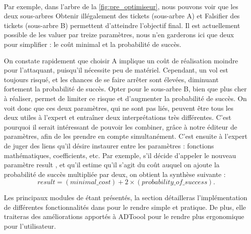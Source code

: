 			\paragraph{}
			Par exemple, dans l'arbre de la {} \ref{fig:pre_optimiseur}, nous pouvons voir que les deux sous-arbres \og Obtenir illégalement des tickets \fg{} (sous-arbre A) et \og Falsifier des tickets \fg{} (sous-arbre B) permettent d'atteindre l'objectif final. Il est actuellement possible de les valuer par treize paramètres, nous n'en garderons ici que deux pour simplifier : le coût minimal et la probabilité de succès.

			On constate rapidement que choisir A implique un coût de réalisation moindre pour l'attaquant, puisqu'il nécessite peu de matériel. Cependant, un vol est toujours risqué, et les chances de se faire arrêter sont élevées, diminuant fortement la probabilité de succès. Opter pour le sous-arbre B, bien que plus cher à réaliser, permet de limiter ce risque et d'augmenter la probabilité de succès. On voit donc que ces deux paramètres, qui ne sont pas liés, peuvent être tous les deux utiles à l'expert et entraîner deux interprétations très différentes. C'est pourquoi il serait intéressant de pouvoir les combiner, grâce à notre éditeur de paramètres, afin de les prendre en compte simultanément. C'est ensuite à l'expert de juger des liens qu'il désire instaurer entre les paramètres : fonctions mathématiques, coefficients, etc. Par exemple, s'il décide d'appeler le nouveau paramètre \og result \fg{}, et qu'il estime qu'il s'agit du coût auquel on ajoute la probabilité de succès multipliée par deux, on obtient la synthèse suivante : \[ result = (minimal\_cost) + 2 \times (probability\_of\_success).\]

			Les principaux modules de \glasir étant présentés, la section détailleras l'implémentation de différentes fonctionnalités dans \glasir{} pour le rendre simple et pratique. De plus, elle traiteras des améliorations apportés à ADToool pour le rendre plus ergonomique pour l'utilisateur.
